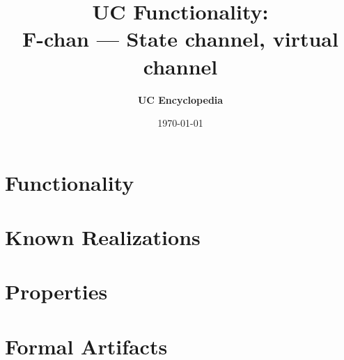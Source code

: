 \documentclass[11pt,a4paper]{article}
\title{\textbf{\Large UC Functionality:}\\[0.2em] \Large F-chan --- State channel, virtual channel}
\author{\textbf{UC Encyclopedia}}
\date{\today}
\newtheorem{functionality}{Functionality}
\begin{document}
\maketitle

\begin{abstract}
\end{abstract}

\section{Functionality}

%

\section{Known Realizations}


\section{Properties}


\section{Formal Artifacts}

\end{document}
